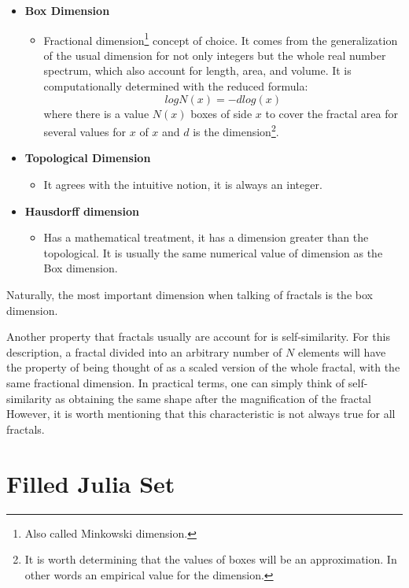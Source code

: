 \documentclass{article}
\begin{document}
\begin{itemize}
    \item \textbf{Box Dimension}
    \begin{itemize}
        \item Fractional dimension\footnote{Also called Minkowski dimension.} concept of choice. It comes from the generalization of the usual dimension for not only integers but the whole real number spectrum, which also account for length, area, and volume. It is computationally determined with the reduced formula:
        \begin{equation}
            log N(x)=- dlog(x)
        \end{equation}
         where there is a value $N(x)$ boxes of side $x$ to cover the fractal area for several values for $x$ of $x$ and $d$ is the dimension\footnote{It is worth determining that the values of boxes will be an approximation. In other words an empirical value for the dimension.}.
    \end{itemize}
   
    \item \textbf{Topological Dimension}
    \begin{itemize}
        \item It agrees with the intuitive notion, it is always an integer. 
    \end{itemize}
    \item \textbf{Hausdorff dimension}
    \begin{itemize}
        \item Has a mathematical treatment, it has a dimension greater than the topological. It is usually the same numerical value of dimension as the Box dimension.
    \end{itemize}
\end{itemize}

Naturally, the most important dimension when talking of fractals is the box dimension.

Another property that fractals usually are account for is self-similarity. For this description, a fractal divided into an arbitrary number of $N$ elements will have the property of being thought of as a scaled version of the whole fractal, with the same fractional dimension\cite{Crownover}. In practical terms, one can simply think of self-similarity as obtaining the same shape after the magnification of the fractal However, it is worth mentioning that this characteristic is not always true for all fractals.


\newpage
\section{Filled Julia Set}
\end{document}
